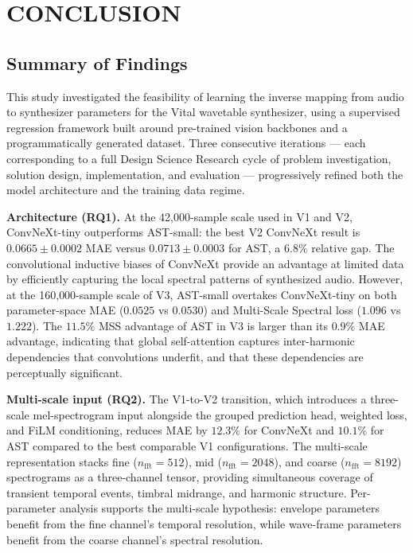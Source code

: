 
\section{CONCLUSION}
\label{sec:conclusion}

\subsection{Summary of Findings}

\noindent
This study investigated the feasibility of learning the inverse mapping from audio to synthesizer parameters for the Vital wavetable synthesizer, using a supervised regression framework built around pre-trained vision backbones and a programmatically generated dataset. Three consecutive iterations — each corresponding to a full Design Science Research cycle of problem investigation, solution design, implementation, and evaluation — progressively refined both the model architecture and the training data regime.

\noindent \newline
\textbf{Architecture (RQ1).} At the 42{,}000-sample scale used in V1 and V2, ConvNeXt-tiny outperforms AST-small: the best V2 ConvNeXt result is $0.0665 \pm 0.0002$ MAE versus $0.0713 \pm 0.0003$ for AST, a $6.8\%$ relative gap. The convolutional inductive biases of ConvNeXt provide an advantage at limited data by efficiently capturing the local spectral patterns of synthesized audio. However, at the 160{,}000-sample scale of V3, AST-small overtakes ConvNeXt-tiny on both parameter-space MAE ($0.0525$ vs $0.0530$) and Multi-Scale Spectral loss ($1.096$ vs $1.222$). The $11.5\%$ MSS advantage of AST in V3 is larger than its $0.9\%$ MAE advantage, indicating that global self-attention captures inter-harmonic dependencies that convolutions underfit, and that these dependencies are perceptually significant.

\noindent \newline
\textbf{Multi-scale input (RQ2).} The V1-to-V2 transition, which introduces a three-scale mel-spectrogram input alongside the grouped prediction head, weighted loss, and FiLM conditioning, reduces MAE by $12.3\%$ for ConvNeXt and $10.1\%$ for AST compared to the best comparable V1 configurations. The multi-scale representation stacks fine ($n_\text{fft}=512$), mid ($n_\text{fft}=2048$), and coarse ($n_\text{fft}=8192$) spectrograms as a three-channel tensor, providing simultaneous coverage of transient temporal events, timbral midrange, and harmonic structure. Per-parameter analysis supports the multi-scale hypothesis: envelope parameters benefit from the fine channel's temporal resolution, while wave-frame parameters benefit from the coarse channel's spectral resolution.

